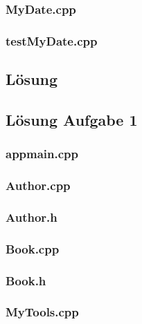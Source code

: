 \subsubsection{MyDate.cpp}

\subsubsection{testMyDate.cpp}


\setcounter{section}{5}

\subsection{Lösung}

\subsection{Lösung Aufgabe 1}
\subsubsection{appmain.cpp}

\subsubsection{Author.cpp}

\subsubsection{Author.h}

\subsubsection{Book.cpp}

\subsubsection{Book.h}

\subsubsection{MyTools.cpp}

